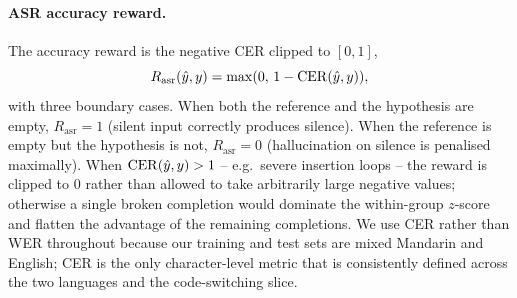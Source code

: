 \paragraph{ASR accuracy reward.}
The accuracy reward is the negative CER clipped to $[0, 1]$,
\begin{equation}
  R_\mathrm{asr}(\hat{y}, y) = \max(0,\, 1 - \mathrm{CER}(\hat{y}, y)),
  \label{eq:reward-asr}
\end{equation}
with three boundary cases. When both the reference and the
hypothesis are empty, $R_\mathrm{asr}=1$ (silent input correctly
produces silence). When the reference is empty but the hypothesis
is not, $R_\mathrm{asr}=0$ (hallucination on silence is penalised
maximally). When $\mathrm{CER}(\hat{y}, y) > 1$ -- e.g.\ severe insertion
loops -- the reward is clipped to $0$ rather than allowed to take
arbitrarily large negative values; otherwise a single broken
completion would dominate the within-group $z$-score and flatten
the advantage of the remaining completions. We use CER rather than
WER throughout because our training and test sets are mixed
Mandarin and English; CER is the only character-level metric that
is consistently defined across the two languages and the
code-switching slice.

